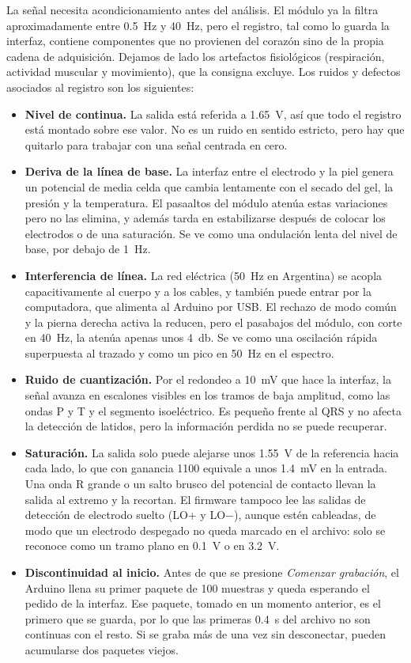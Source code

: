 La señal necesita acondicionamiento antes del análisis. El módulo ya la filtra aproximadamente entre \SI{0.5}{\hertz} y \SI{40}{\hertz}, pero el registro, tal como lo guarda la interfaz, contiene componentes que no provienen del corazón sino de la propia cadena de adquisición. Dejamos de lado los artefactos fisiológicos (respiración, actividad muscular y movimiento), que la consigna excluye. Los ruidos y defectos asociados al registro son los siguientes:

\begin{itemize}
  \item \textbf{Nivel de continua.} La salida está referida a \SI{1.65}{\volt}, así que todo el registro está montado sobre ese valor. No es un ruido en sentido estricto, pero hay que quitarlo para trabajar con una señal centrada en cero.
  \item \textbf{Deriva de la línea de base.} La interfaz entre el electrodo y la piel genera un potencial de media celda que cambia lentamente con el secado del gel, la presión y la temperatura. El pasaaltos del módulo atenúa estas variaciones pero no las elimina, y además tarda en estabilizarse después de colocar los electrodos o de una saturación. Se ve como una ondulación lenta del nivel de base, por debajo de \SI{1}{\hertz}.
  \item \textbf{Interferencia de línea.} La red eléctrica (\SI{50}{\hertz} en Argentina) se acopla capacitivamente al cuerpo y a los cables, y también puede entrar por la computadora, que alimenta al Arduino por USB. El rechazo de modo común y la pierna derecha activa la reducen, pero el pasabajos del módulo, con corte en \SI{40}{\hertz}, la atenúa apenas unos \SI{4}{\decibel}. Se ve como una oscilación rápida superpuesta al trazado y como un pico en \SI{50}{\hertz} en el espectro.
  \item \textbf{Ruido de cuantización.} Por el redondeo a \SI{10}{\milli\volt} que hace la interfaz, la señal avanza en escalones visibles en los tramos de baja amplitud, como las ondas P y T y el segmento isoeléctrico. Es pequeño frente al QRS y no afecta la detección de latidos, pero la información perdida no se puede recuperar.
  \item \textbf{Saturación.} La salida solo puede alejarse unos \SI{1.55}{\volt} de la referencia hacia cada lado, lo que con ganancia 1100 equivale a unos \SI{1.4}{\milli\volt} en la entrada. Una onda R grande o un salto brusco del potencial de contacto llevan la salida al extremo y la recortan. El firmware tampoco lee las salidas de detección de electrodo suelto (LO+ y LO$-$), aunque estén cableadas, de modo que un electrodo despegado no queda marcado en el archivo: solo se reconoce como un tramo plano en \SI{0.1}{\volt} o en \SI{3.2}{\volt}.
  \item \textbf{Discontinuidad al inicio.} Antes de que se presione \textit{Comenzar grabación}, el Arduino llena su primer paquete de 100 muestras y queda esperando el pedido de la interfaz. Ese paquete, tomado en un momento anterior, es el primero que se guarda, por lo que las primeras \SI{0.4}{\second} del archivo no son continuas con el resto. Si se graba más de una vez sin desconectar, pueden acumularse dos paquetes viejos.
\end{itemize}

